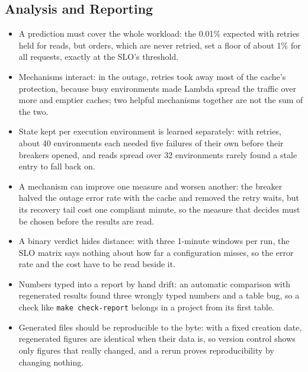 \documentclass[10pt]{article}
\begin{document}
\subsection{Analysis and Reporting}
\begin{itemize}
  \item A prediction must cover the whole workload: the 0.01\% expected with
  retries held for reads, but orders, which are never retried, set a floor of
  about 1\% for all requests, exactly at the SLO's threshold.
  \item Mechanisms interact: in the outage, retries took away most of the
  cache's protection, because busy environments made Lambda spread the traffic
  over more and emptier caches; two helpful mechanisms together are not the sum
  of the two.
  \item State kept per execution environment is learned separately: with
  retries, about 40 environments each needed five failures of their own before
  their breakers opened, and reads spread over 32 environments rarely found a
  stale entry to fall back on.
  \item A mechanism can improve one measure and worsen another: the breaker
  halved the outage error rate with the cache and removed the retry waits, but
  its recovery tail cost one compliant minute, so the measure that decides must
  be chosen before the results are read.
  \item A binary verdict hides distance: with three 1-minute windows per run,
  the SLO matrix says nothing about how far a configuration misses, so the
  error rate and the cost have to be read beside it.
  \item Numbers typed into a report by hand drift: an automatic comparison
  with regenerated results found three wrongly typed numbers and a table bug,
  so a check like \texttt{make check-report} belongs in a project from its
  first table.
  \item Generated files should be reproducible to the byte: with a fixed
  creation date, regenerated figures are identical when their data is, so
  version control shows only figures that really changed, and a rerun proves
  reproducibility by changing nothing.
\end{itemize}

\end{document}
